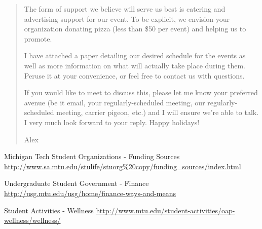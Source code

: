 \documentclass[article]{memoir}
\begin{document}
\begin{quotation}
The form of support we believe will serve us best is catering and advertising
support for our event. To be explicit, we envision your organization donating
pizza (less than \$50 per event) and helping us to promote.

I have attached a paper detailing our desired schedule for the events as well as
more information on what will actually take place during them. Peruse it at your
convenience, or feel free to contact us with questions.

If you would like to meet to discuss this, please let me know your preferred
avenue (be it email, your regularly-scheduled meeting, our regularly-scheduled
meeting, carrier pigeon, etc.) and I will ensure we're able to talk. I very much
look forward to your reply. Happy holidays!

Alex

\end{quotation}



\begin{thebibliography}{9}

 Michigan Tech Student Organizations - Funding Sources\newline
{\footnotesize\url{http://www.sa.mtu.edu/stulife/stuorg\%20copy/funding_sources/index.html}}

 Undergraduate Student Government - Finance\newline
{\footnotesize\url{http://usg.mtu.edu/usg/home/finance-ways-and-means}}

 Student Activities - Wellness\newline
{\footnotesize\url{http://www.mtu.edu/student-activities/oap-wellness/wellness/}}

\end{thebibliography}
\end{document}
